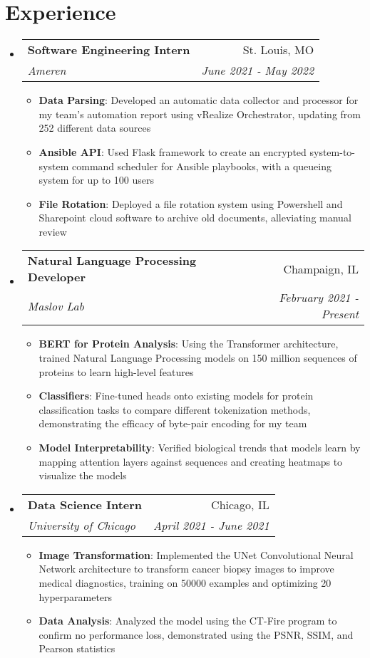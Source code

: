 \documentclass[letterpaper,11pt]{article}
\makeatletter
\newcommand{\resumeItem}[2]{
  \item\small{
    \textbf{#1}{: #2 \vspace{-2pt}}
  }
}
\newcommand{\resumeSubheading}[4]{
  \vspace{-1pt}\item
    \begin{tabular*}{0.97\textwidth}{l@{\extracolsep{\fill}}r}
      \textbf{#1} & #2 \\
      \textit{\small#3} & \textit{\small #4} \\
    \end{tabular*}\vspace{-5pt}
}
\newcommand{\resumeSubHeadingListStart}{\begin{itemize}[leftmargin=1mm]}
\newcommand{\resumeSubHeadingListEnd}{\end{itemize}}
\newcommand{\resumeItemListStart}{\begin{itemize}[rightmargin=11.5mm]}
\newcommand{\resumeItemListEnd}{\end{itemize}\vspace{-5pt}}
\makeatother
\begin{document}
\section{Experience} 
  \resumeSubHeadingListStart
    \renewcommand\labelitemi{}
    \resumeSubheading
      {Software Engineering Intern}{St. Louis, MO}
      {Ameren}{June 2021 - May 2022}
      \resumeItemListStart
        \resumeItem{Data Parsing}
          {Developed an automatic data collector and processor for my team's automation report using vRealize Orchestrator, updating from 252 different data sources}
        \resumeItem{Ansible API}
          {Used Flask framework to create an encrypted system-to-system command scheduler for Ansible playbooks, with a queueing system for up to 100 users}
        \resumeItem{File Rotation} {Deployed a file rotation system using Powershell and Sharepoint cloud software to archive old documents, alleviating manual review}
      \resumeItemListEnd
    \resumeSubheading
      {Natural Language Processing Developer}{Champaign, IL}
      {Maslov Lab}{February 2021 - Present}
      \resumeItemListStart
        \resumeItem{BERT for Protein Analysis}
          {Using the Transformer architecture, trained Natural Language Processing models on 150 million sequences of proteins to learn high-level features} \citep{sanborn_learning_2014}
        \resumeItem{Classifiers}
          {Fine-tuned heads onto existing models for protein classification tasks to compare different tokenization methods, demonstrating the efficacy of byte-pair encoding for my team}
        \resumeItem{Model Interpretability} {Verified biological trends that models learn by mapping attention layers against sequences and creating heatmaps to visualize the models}
      \resumeItemListEnd

    \resumeSubheading
      {Data Science Intern}{Chicago, IL}
      {University of Chicago}{April 2021 - June 2021}
      \resumeItemListStart
        \resumeItem{Image Transformation}
          {Implemented the UNet Convolutional Neural Network architecture to transform cancer biopsy images to improve medical diagnostics, training on 50000 examples and optimizing 20 hyperparameters}
        \resumeItem{Data Analysis}
          {Analyzed the model using the CT-Fire program to confirm no performance loss, demonstrated using the PSNR, SSIM, and Pearson statistics}
      \resumeItemListEnd

  \resumeSubHeadingListEnd

\end{document}
